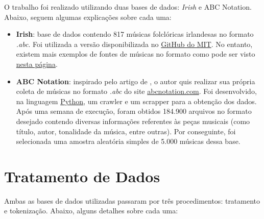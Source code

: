 \documentclass{automatextcc}
\begin{document}


O trabalho foi realizado utilizando duas bases de dados: \textit{Irish} e {ABC Notation}. Abaixo, seguem algumas explicações sobre cada uma:

\begin{itemize}
    \item \textbf{Irish}: base de dados contendo 817 músicas folclóricas irlandesas no formato \textit{.abc}. Foi utilizada a versão disponibilizada no \href{https://github.com/aamini/introtodeeplearning/blob/master/mitdeeplearning/data/irish.abc}{GitHub do MIT}. No entanto, existem mais exemplos de fontes de músicas no formato como pode ser visto \href{https://www.norbeck.nu/abc/links.asp}{nesta página}. 
    \item \textbf{ABC Notation}: inspirado pelo artigo de \citet{agarwala2017}, o autor quis realizar sua própria coleta de músicas no formato \textit{.abc} do site \href{https://abcnotation.com/}{abcnotation.com}. Foi desenvolvido, na linguagem \href{https://python.org/}{Python}, um crawler e um scrapper para a obtenção dos dados. Após uma semana de execução, foram obtidos 184.900 arquivos no formato desejado contendo diversas informações referentes às peças musicais (como título, autor, tonalidade da música, entre outras). Por conseguinte, foi selecionada uma amostra aleatória simples de 5.000 músicas dessa base.
\end{itemize}




\section{Tratamento de Dados}



Ambas as bases de dados utilizadas passaram por três procedimentos: tratamento e tokenização. Abaixo, alguns detalhes sobre cada uma:
\end{document}
